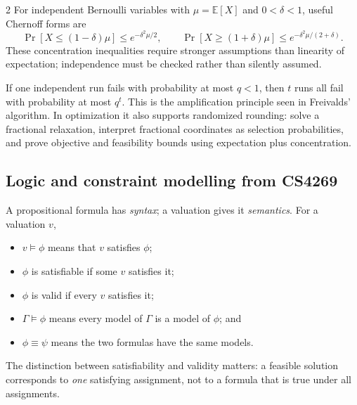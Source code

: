 \documentclass[8pt]{extarticle}
\theoremstyle{definition}
\begin{document}
\begin{multicols*}{2}
For independent Bernoulli variables with $\mu=\mathbb{E}[X]$ and
$0<\delta<1$, useful Chernoff forms are
\[
  \Pr[X\le(1-\delta)\mu]\le e^{-\delta^2\mu/2},\qquad
  \Pr[X\ge(1+\delta)\mu]\le e^{-\delta^2\mu/(2+\delta)}.
\]
These concentration inequalities require stronger assumptions than linearity
of expectation; independence must be checked rather than silently assumed.

If one independent run fails with probability at most $q<1$, then $t$ runs
all fail with probability at most $q^t$.  This is the amplification principle
seen in Freivalds' algorithm.  In optimization it also supports randomized
rounding: solve a fractional relaxation, interpret fractional coordinates as
selection probabilities, and prove objective and feasibility bounds using
expectation plus concentration.

\subsection{Logic and constraint modelling from CS4269}

A propositional formula has \emph{syntax}; a valuation gives it
\emph{semantics}.  For a valuation $v$,
\begin{itemize}
  \item $v\models\phi$ means that $v$ satisfies $\phi$;
  \item $\phi$ is satisfiable if some $v$ satisfies it;
  \item $\phi$ is valid if every $v$ satisfies it;
  \item $\Gamma\models\phi$ means every model of $\Gamma$ is a model of
        $\phi$; and
  \item $\phi\equiv\psi$ means the two formulas have the same models.
\end{itemize}
The distinction between satisfiability and validity matters: a feasible
solution corresponds to \emph{one} satisfying assignment, not to a formula
that is true under all assignments.


\end{multicols*}
\end{document}
